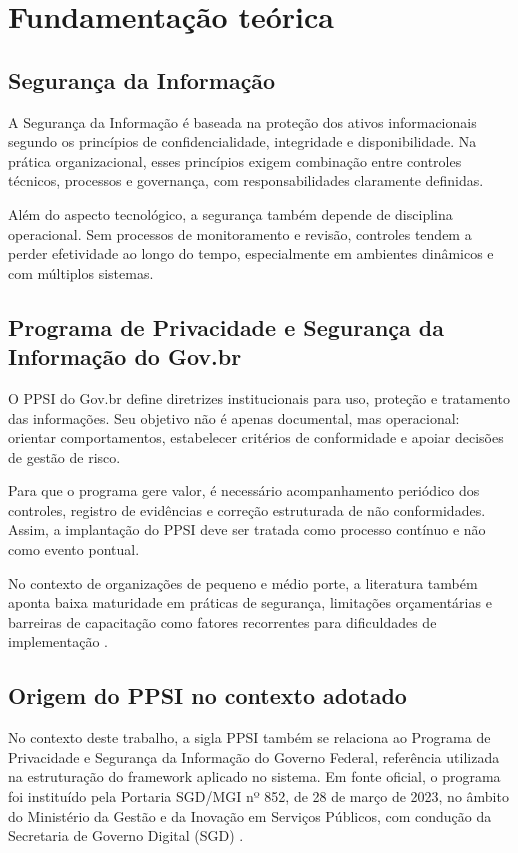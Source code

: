 \documentclass[12pt]{article}
\begin{document}
\section{Fundamentação teórica}

\subsection{Segurança da Informação}

A Segurança da Informação é baseada na proteção dos ativos informacionais segundo os princípios de confidencialidade, integridade e disponibilidade. Na prática organizacional, esses princípios exigem combinação entre controles técnicos, processos e governança, com responsabilidades claramente definidas.

Além do aspecto tecnológico, a segurança também depende de disciplina operacional. Sem processos de monitoramento e revisão, controles tendem a perder efetividade ao longo do tempo, especialmente em ambientes dinâmicos e com múltiplos sistemas.

\subsection{Programa de Privacidade e Segurança da Informação do Gov.br}

O PPSI do Gov.br define diretrizes institucionais para uso, proteção e tratamento das informações. Seu objetivo não é apenas documental, mas operacional: orientar comportamentos, estabelecer critérios de conformidade e apoiar decisões de gestão de risco.

Para que o programa gere valor, é necessário acompanhamento periódico dos controles, registro de evidências e correção estruturada de não conformidades. Assim, a implantação do PPSI deve ser tratada como processo contínuo e não como evento pontual.

No contexto de organizações de pequeno e médio porte, a literatura também aponta baixa maturidade em práticas de segurança, limitações orçamentárias e barreiras de capacitação como fatores recorrentes para dificuldades de implementação \cite{rombaldo2023,chidukwani2024,sciencedirect2024}.

\subsection{Origem do PPSI no contexto adotado}

No contexto deste trabalho, a sigla PPSI também se relaciona ao Programa de Privacidade e Segurança da Informação do Governo Federal, referência utilizada na estruturação do framework aplicado no sistema. Em fonte oficial, o programa foi instituído pela Portaria SGD/MGI nº 852, de 28 de março de 2023, no âmbito do Ministério da Gestão e da Inovação em Serviços Públicos, com condução da Secretaria de Governo Digital (SGD) \cite{mgi_ppsi_programa,mgi_framework_ppsi}.
\end{document}
